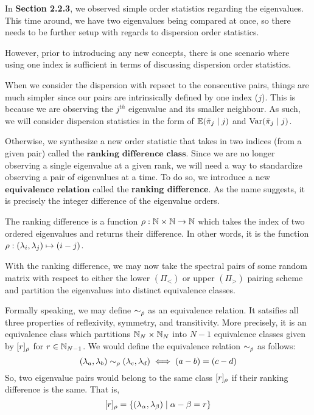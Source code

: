 In \textbf{Section 2.2.3}, we observed simple order statistics regarding the eigenvalues.
This time around, we have two eigenvalues being compared at once, so there needs to be further setup with regards to dispersion order statistics.

However, prior to introducing any new concepts, there is one scenario where using one index is sufficient in terms of discussing dispersion order statistics.

\begin{remark}
When we consider the dispersion with repsect to the consecutive pairs, things are much simpler since our pairs are intrinsically defined by one index ($j$).
This is because we are observing the $j^{th}$ eigenvalue and its smaller neighbour. As such, we will consider dispersion statistics in the form of $\mathbb{E}({\tilde{\pi}}_j \mid j)$ and $\text{Var}({\tilde{\pi}}_j \mid j)$.
\end{remark}

Otherwise, we synthesize a new order statistic that takes in two indices (from a given pair) called the $\textbf{ranking difference class}$.
Since we are no longer observing a single eigenvalue at a given rank, we will need a way to standardize observing a pair of eigenvalues at a time.
To do so, we introduce a new $\textbf{equivalence relation}$ called the \textbf{ranking difference}. As the name suggests, it is precisely the integer difference of the eigenvalue orders.


\begin{definition}
The ranking difference is a function ${\rho}: \mathbb{N} \times \mathbb{N} \to \mathbb{N}$ which takes the index of two ordered eigenvalues and returns their difference.
In other words, it is the function ${\rho}: (\lambda_i,\lambda_j) \mapsto (i - j)$.
\end{definition}

With the ranking difference, we may now take the spectral pairs of some random matrix with respect to either the lower $(\Pi_<)$ or upper $(\Pi_>)$ pairing scheme
and partition the eigenvalues into distinct equivalence classes.

\begin{remark}
Formally speaking, we may define $\sim_{\rho}$ as an equivalence relation. It satsifies all three properties of reflexivity, symmetry, and transitivity.
More precisely, it is an equivalence class which partitions $\mathbb{N}_N \times \mathbb{N}_N$ into $N - 1$ equivalence classes given by $[r]_{\rho}$ for $r \in \mathbb{N}_{N-1}$.
We would define the equivalence relation $\sim_{\rho}$ as follows:
$$(\lambda_a,\lambda_b) \sim_{\rho} (\lambda_c,\lambda_d) \iff (a -b) = (c-d)$$
So, two eigenvalue pairs would belong to the same class $[r]_{\rho}$ if their ranking difference is the same. That is,
$$[r]_{\rho} = \{(\lambda_\alpha, \lambda_\beta) \mid \alpha - \beta = r\}$$
\end{remark}

